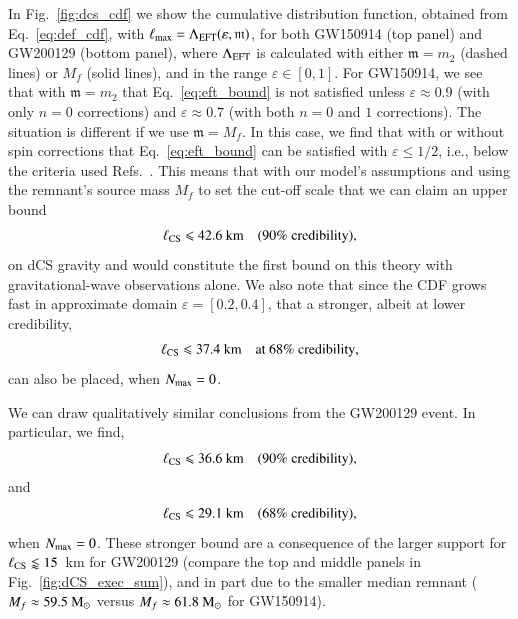 \documentclass[twocolumn,
               prd,
               aps,
               superscriptaddress,
               tightenlines,
               nofootinbib,
               eqsecnum,
               amsfonts,
               amsmath,
               longbibliography]{revtex4-1}
\newcommand{\gm}{\mathfrak{m}}
\newcommand{\msun}{~{\rm M}_{\odot}}
\begin{document}
In Fig.~\ref{fig:dcs_cdf} we show the cumulative distribution function,
obtained from Eq.~\eqref{eq:def_cdf}, with $\ell_{\rm max} = \Lambda_{\rm EFT} (\varepsilon, \gm)$,
for both GW150914 (top panel) and GW200129 (bottom panel), where $\Lambda_{\rm EFT}$
is calculated with either $\gm = m_2$ (dashed lines) or $M_{f}$ (solid lines),
and in the range $\varepsilon \in [0,1]$.
%
For GW150914, we see that with $\gm = m_2$ that Eq.~\eqref{eq:eft_bound} is not
satisfied unless $\varepsilon \approx 0.9$ (with only $n=0$ corrections) and
$\varepsilon \approx 0.7$ (with both $n=0$ and $1$ corrections).
%
The situation is different if we use $\gm = M_f$. In this case, we find that
with or without spin corrections that Eq.~\eqref{eq:eft_bound} can be satisfied
with $\varepsilon \leqslant 1/2$, i.e., below the criteria used
Refs.~\cite{Nair:2019iur,Perkins:2021mhb,Lyu:2022gdr}.
%
This means that with our model's assumptions and using the remnant's source mass $M_f$ to set the
cut-off scale that we can claim an upper bound
%
\begin{equation}
\ell_{\rm CS} \leqslant 42.6~\textrm{km}
\quad \textrm{(90\% credibility)},
\end{equation}
%
on dCS gravity and would constitute the first bound on this theory with
gravitational-wave observations alone.
%
We also note that since the CDF grows fast in approximate domain $\varepsilon = [0.2, 0.4]$,
that a stronger, albeit at lower credibility,
%
\begin{equation}
\ell_{\rm CS} \leqslant 37.4~\textrm{km}
\quad \textrm{at 68\% credibility},
\end{equation}
%
can also be placed, when $N_{\rm max}=0$.

We can draw qualitatively similar conclusions from the GW200129 event.
In particular, we find,
%
\begin{equation}
\ell_{\rm CS} \leqslant 36.6~\textrm{km}
\quad \textrm{(90\% credibility)},
\end{equation}
%
and
%
\begin{equation}
\ell_{\rm CS} \leqslant 29.1~\textrm{km}
\quad \textrm{(68\% credibility)},
\end{equation}
%
when $N_{\rm max}=0$.
%
These stronger bound are a consequence of the larger support for $\ell_{\rm CS} \lessapprox 15$~km
for GW200129 (compare the top and middle panels in Fig.~\ref{fig:dCS_exec_sum}), and in part due to
the smaller median remnant ($M_{f} \approx 59.5\msun$ versus $M_{f} \approx 61.8\msun$ for GW150914).
\end{document}
